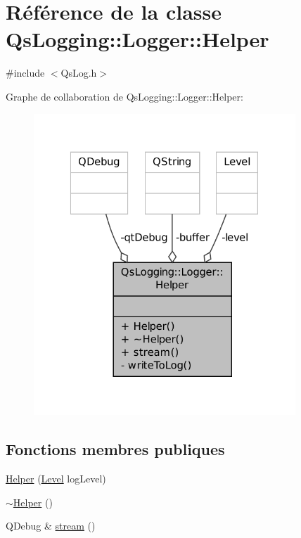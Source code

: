 \hypertarget{classQsLogging_1_1Logger_1_1Helper}{\section{Référence de la classe Qs\-Logging\-:\-:Logger\-:\-:Helper}
\label{classQsLogging_1_1Logger_1_1Helper}
}


{\ttfamily \#include $<$Qs\-Log.\-h$>$}



Graphe de collaboration de Qs\-Logging\-:\-:Logger\-:\-:Helper\-:
\nopagebreak
\begin{figure}[H]
\begin{center}
\leavevmode
\includegraphics[width=279pt]{classQsLogging_1_1Logger_1_1Helper__coll__graph}
\end{center}
\end{figure}
\subsection*{Fonctions membres publiques}
\begin{DoxyCompactItemize}
\item 
\hyperlink{classQsLogging_1_1Logger_1_1Helper_ad0634422d3a7d8acc4bfd696dc326d18}{Helper} (\hyperlink{namespaceQsLogging_a38c7dd87e4de6f8eb460763ad0baa033}{Level} log\-Level)
\item 
\hyperlink{classQsLogging_1_1Logger_1_1Helper_a6e92fb30ec3d3fb057d2b7b85d6a6ec6}{$\sim$\-Helper} ()
\item 
Q\-Debug \& \hyperlink{classQsLogging_1_1Logger_1_1Helper_a9ed23a587a07da47066130fe2a92891e}{stream} ()
\end{DoxyCompactItemize}
